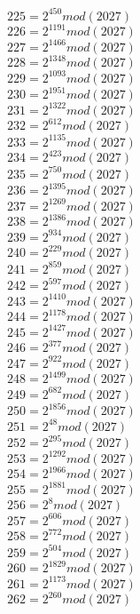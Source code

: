 \documentclass[12pt, letterpaper]{article}
\begin{document}
\begin{itemize}
\begin{multicols}{3}
$225= 2^{450} mod (2027)$\\
$226= 2^{1191} mod (2027)$\\
$227= 2^{1466} mod (2027)$\\
$228= 2^{1348} mod (2027)$\\
$229= 2^{1093} mod (2027)$\\
$230= 2^{1951} mod (2027)$\\
$231= 2^{1322} mod (2027)$\\
$232= 2^{612} mod (2027)$\\
$233= 2^{1135} mod (2027)$\\
$234= 2^{423} mod (2027)$\\
$235= 2^{750} mod (2027)$\\
$236= 2^{1395} mod (2027)$\\
$237= 2^{1269} mod (2027)$\\
$238= 2^{1386} mod (2027)$\\
$239= 2^{934} mod (2027)$\\
$240= 2^{229} mod (2027)$\\
$241= 2^{859} mod (2027)$\\
$242= 2^{597} mod (2027)$\\
$243= 2^{1410} mod (2027)$\\
$244= 2^{1178} mod (2027)$\\
$245= 2^{1427} mod (2027)$\\
$246= 2^{377} mod (2027)$\\
$247= 2^{922} mod (2027)$\\
$248= 2^{1499} mod (2027)$\\
$249= 2^{682} mod (2027)$\\
$250= 2^{1856} mod (2027)$\\
$251= 2^{48} mod (2027)$\\
$252= 2^{295} mod (2027)$\\
$253= 2^{1292} mod (2027)$\\
$254= 2^{1966} mod (2027)$\\
$255= 2^{1881} mod (2027)$\\
$256= 2^{8} mod (2027)$\\
$257= 2^{606} mod (2027)$\\
$258= 2^{772} mod (2027)$\\
$259= 2^{504} mod (2027)$\\
$260= 2^{1829} mod (2027)$\\
$261= 2^{1173} mod (2027)$\\
$262= 2^{260} mod (2027)$\\

\end{multicols}
\end{itemize}
\end{document}
